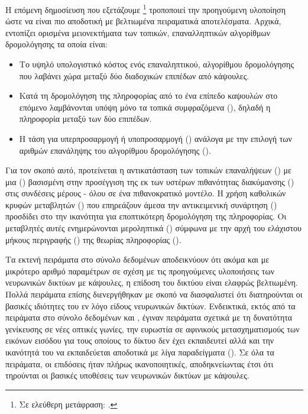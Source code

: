 \subsubsection{}
Η επόμενη δημοσίευση που εξετάζουμε \footnote{Σε ελεύθερη μετάφραση: .}\cite{de2020introducing} τροποποιεί την προηγούμενη υλοποίηση ώστε να είναι πιο αποδοτική με βελτιωμένα πειραματικά αποτελέσματα. Αρχικά, εντοπίζει ορισμένα μειονεκτήματα των τοπικών, επαναλληπτικών αλγορίθμων δρομολόγησης τα οποία είναι:
\begin{itemize}
    \item Το υψηλό υπολογιστικό κόστος ενός επαναληπτικού, αλγορίθμου δρομολόγησης που λαβάνει χώρα μεταξύ δύο διαδοχικών επιπέδων από κάψουλες.
    \item Κατά τη δρομολόγηση της πληροφορίας από το ένα επίπεδο καψουλών στο επόμενο λαμβάνονται υπόψη μόνο τα τοπικά συμφραζόμενα (), δηλαδή η πληροφορία μεταξύ των δύο επιπέδων.
    \item Η τάση για υπερπροσαρμογή ή υποπροσαρμογή () ανάλογα με την επιλογή των αριθμών επανάληψης του αλγορίθμου δρομολόγησης ().
\end{itemize}
Για τον σκοπό αυτό, προτείνεται η αντικατάσταση των τοπικών επαναλήψεων () με μια  () βασισμένη στην προσέγγιση της εκ των υστέρων πιθανότητας διακύμανσης () στις συνδέσεις μέρους - όλου σε ένα πιθανοκρατικό μοντέλο. Η χρήση καθολικών κρυφών μεταβλητών () που επηρεάζουν άμεσα την αντικειμενική συνάρτηση () προσδίδει στο  την ικανότητα για εποπτικότερη δρομολόγηση της πληροφορίας. Οι μεταβλητές αυτές ενημερώνονται μεροληπτικά () σύμφωνα με την αρχή του ελάχιστου μήκους περιγραφής () της θεωρίας πληροφορίας ().\par

Τα εκτενή πειράματα στο σύνολο δεδομένων  αποδεικνύουν ότι ακόμα και με μικρότερο αριθμό παραμέτρων σε σχέση με τις προηγούμενες υλοποιήσεις των νευρωνικών δικτύων με κάψουλες, η επίδοση του δικτύου είναι ελαφρώς βελτιωμένη. Πολλά πειράματα επίσης διενεργήθηκαν με σκοπό να διασφαλιστεί ότι διατηρούνται οι βασικές ιδιότητες του εν λόγο είδους νευρωνικών δικτύων. Ενδεικτικά, εκτός από τα πειράματα στο σύνολο δεδομένων  και , έγιναν πειράματα σχετικά με τη δυνατότητα γενίκευσης σε νέες οπτικές γωνίες, την ευρωστία σε αφινικούς μετασχηματισμούς των εικόνων εισόδου για τους οποίους το δίκτυο δεν έχει εκπαιδευτεί αλλά και την ικανότητά του να εκπαιδεύεται αποδοτικά με λίγα παραδείγματα (). Σε όλα τα πειράματα, οι επιδόσεις ήταν πλήρως ικανοποιητικές, αποδηκνείωντας έτσι ότι τηρούνται οι βασικές υποθέσεις των νευρωνικών δικτύων με κάψουλες.

